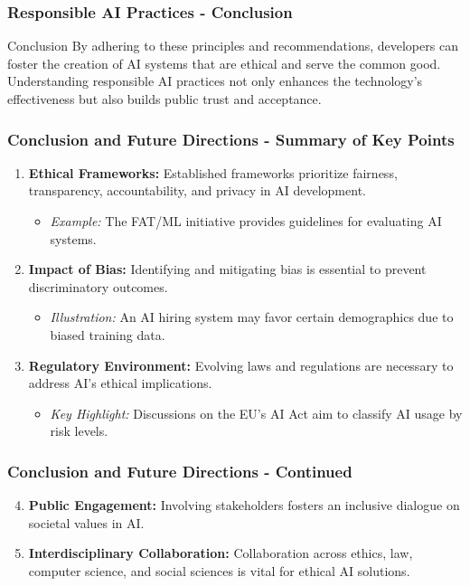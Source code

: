 \documentclass{beamer}
\begin{document}
\begin{frame}[fragile]
    \frametitle{Responsible AI Practices - Conclusion}
    \begin{block}{Conclusion}
        By adhering to these principles and recommendations, developers can foster the creation of AI systems that are ethical and serve the common good. Understanding responsible AI practices not only enhances the technology’s effectiveness but also builds public trust and acceptance.
    \end{block}
\end{frame}

\begin{frame}[fragile]
    \frametitle{Conclusion and Future Directions - Summary of Key Points}
    \begin{enumerate}
        \item \textbf{Ethical Frameworks:} Established frameworks prioritize fairness, transparency, accountability, and privacy in AI development.
        \begin{itemize}
            \item \textit{Example:} The FAT/ML initiative provides guidelines for evaluating AI systems.
        \end{itemize}
        
        \item \textbf{Impact of Bias:} Identifying and mitigating bias is essential to prevent discriminatory outcomes.
        \begin{itemize}
            \item \textit{Illustration:} An AI hiring system may favor certain demographics due to biased training data.
        \end{itemize}
        
        \item \textbf{Regulatory Environment:} Evolving laws and regulations are necessary to address AI's ethical implications.
        \begin{itemize}
            \item \textit{Key Highlight:} Discussions on the EU's AI Act aim to classify AI usage by risk levels.
        \end{itemize}
    \end{enumerate}
\end{frame}

\begin{frame}[fragile]
    \frametitle{Conclusion and Future Directions - Continued}
    \begin{enumerate}
        \setcounter{enumi}{3}
        \item \textbf{Public Engagement:} Involving stakeholders fosters an inclusive dialogue on societal values in AI.
        
        \item \textbf{Interdisciplinary Collaboration:} Collaboration across ethics, law, computer science, and social sciences is vital for ethical AI solutions.
    \end{enumerate}
\end{frame}
\end{document}

